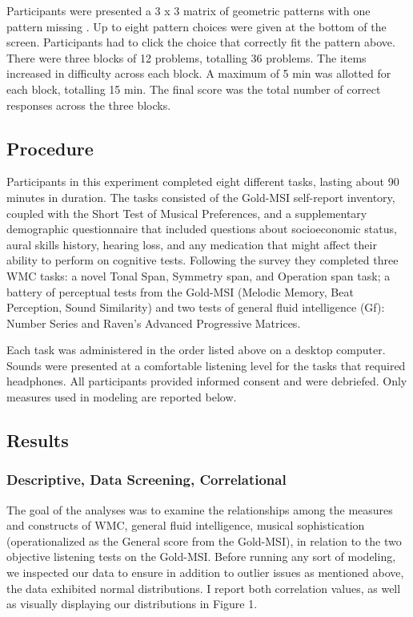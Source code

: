 \documentclass[]{book}
\begin{document}
Participants were presented a 3 x 3 matrix of geometric patterns with one pattern missing \citep{ravenManualRavenProgressive1994}. Up to eight pattern choices were given at the bottom of the screen.
Participants had to click the choice that correctly fit the pattern above.
There were three blocks of 12 problems, totalling 36 problems.
The items increased in difficulty across each block.
A maximum of 5 min was allotted for each block, totalling 15 min.
The final score was the total number of correct responses across the three blocks.

\hypertarget{procedure}{%
\subsection{Procedure}\label{procedure}}

Participants in this experiment completed eight different tasks, lasting about 90 minutes in duration.
The tasks consisted of the Gold-MSI self-report inventory, coupled with the Short Test of Musical Preferences, and a supplementary demographic questionnaire that included questions about socioeconomic status, aural skills history, hearing loss, and any medication that might affect their ability to perform on cognitive tests.
Following the survey they completed three WMC tasks: a novel Tonal Span, Symmetry span, and Operation span task; a battery of perceptual tests from the Gold-MSI (Melodic Memory, Beat Perception, Sound Similarity) and two tests of general fluid intelligence (Gf): Number Series and Raven's Advanced Progressive Matrices.

Each task was administered in the order listed above on a desktop computer.
Sounds were presented at a comfortable listening level for the tasks that required headphones.
All participants provided informed consent and were debriefed.
Only measures used in modeling are reported below.

\hypertarget{results}{%
\subsection{Results}\label{results}}

\hypertarget{descriptive-data-screening-correlational}{%
\subsubsection{Descriptive, Data Screening, Correlational}\label{descriptive-data-screening-correlational}}

The goal of the analyses was to examine the relationships among the measures and constructs of WMC, general fluid intelligence, musical sophistication (operationalized as the General score from the Gold-MSI), in relation to the two objective listening tests on the Gold-MSI.
Before running any sort of modeling, we inspected our data to ensure in addition to outlier issues as mentioned above, the data exhibited normal distributions.
I report both correlation values, as well as visually displaying our distributions in Figure 1.
\end{document}
